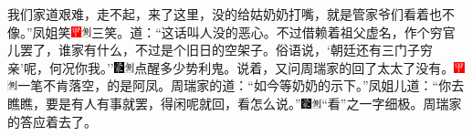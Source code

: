 我们家道艰难，走不起，来了这里，没的给姑奶奶打嘴，就是管家爷们看着也不像。''凤姐笑{\includegraphics[width=3mm]{../Images/00002}\includegraphics[width=3mm]{../Images/00011}\footnotesize \kaishu 三笑。}道：``这话叫人没的恶心。不过借赖着祖父虚名，作个穷官儿罢了，谁家有什么，不过是个旧日的空架子。俗语说，`朝廷还有三门子穷亲'呢，何况你我。''{\includegraphics[width=3mm]{../Images/00006}\includegraphics[width=3mm]{../Images/00011}\footnotesize \kaishu 点醒多少势利鬼。}说着，又问周瑞家的回了太太了没有。{\includegraphics[width=3mm]{../Images/00002}\includegraphics[width=3mm]{../Images/00011}\footnotesize \kaishu 一笔不肯落空，的是阿凤。}周瑞家的道：``如今等奶奶的示下。''凤姐儿道：``你去瞧瞧，要是有人有事就罢，得闲呢就回，看怎么说。''{\includegraphics[width=3mm]{../Images/00006}\includegraphics[width=3mm]{../Images/00011}\footnotesize \kaishu ``看''之一字细极。}周瑞家的答应着去了。

